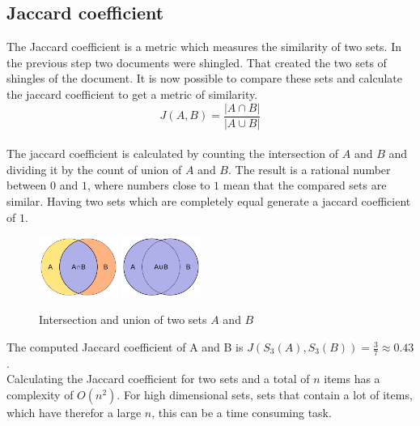\subsection{Jaccard coefficient}

The Jaccard coefficient is a metric which measures the similarity of two sets. In the previous step two documents were shingled. That created the two sets of shingles of the document. It is now possible to compare these sets and calculate the jaccard coefficient to get a metric of similarity.\\

\begin{equation}
    J(A,B) = \frac{ | A \cap B | }{ | A \cup B | }
\end{equation} \\

The jaccard coefficient is calculated by counting the intersection of $ A $ and $ B $ and dividing it by the count of union of $ A $ and $ B $. The result is a rational number between $ 0 $ and $ 1 $, where numbers close to $ 1 $ mean that the compared sets are similar. Having two sets which are completely equal generate a jaccard coefficient of $ 1 $.\\

\begin{figure}[H]
    \centering
    \includegraphics[width=0.23\textwidth]{images/Intersection_of_sets_A_and_B.png} 
    \includegraphics[width=0.23\textwidth]{images/Union_of_sets_A_and_B.png}
    \caption{Intersection and union of two sets $ A $ and $ B $ \cite{intersectionImage,unionImage}}
\end{figure}

The computed Jaccard coefficient of A and B is  $ J(S_3(A),S_3(B)) = \frac{3}{7} \approx 0.43 $.\\

Calculating the Jaccard coefficient for two sets and a total of $ n $ items has a complexity of $ O(n^2) $. For high dimensional sets, sets that contain a lot of items, which have therefor a large $ n $, this can be a time consuming task.\\

